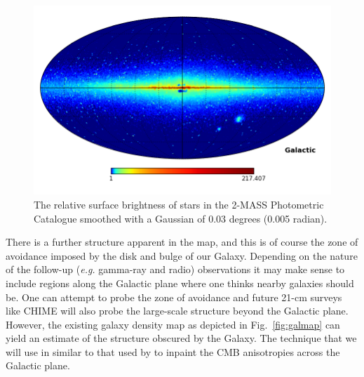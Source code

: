 \documentclass[useAMS,usenatbib]{mn2e}
\begin{document}
\begin{figure}
  \includegraphics[width=\columnwidth]{2mass_density}
  \caption{The relative surface brightness of stars in the 2-MASS
    Photometric Catalogue \citep{2006AJ....131.1163S} smoothed with a Gaussian
    of 0.03 degrees (0.005 radian).}
  \label{fig:starmap}
\end{figure}
There is a further structure apparent in the map, and this is of
course the zone of avoidance imposed by the disk and bulge of our
Galaxy. Depending on the nature of the follow-up
({\em e.g.} gamma-ray and radio) observations it may make
sense to include regions along the Galactic plane where one thinks
nearby galaxies should be. One can attempt to probe the zone of avoidance
\citep[e.g][]{2000AJ....120..298J} and future 21-cm surveys like CHIME
\citep{2014era..conf10102V} will also probe the large-scale structure
beyond the Galactic plane.   However, the existing galaxy density map
as depicted in Fig.~\ref{fig:galmap} can yield an estimate of the
structure obscured by the Galaxy.  The technique that we will use in
similar to that used by \citet{2008StMet...5..289A} to inpaint the CMB
anisotropies across the Galactic plane.
\end{document}
